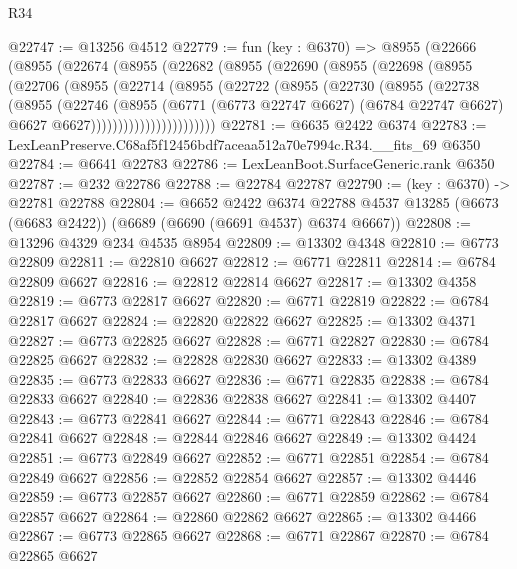 \begin{lexlean}{R34}
\begin{coremodule}
@22747 := @13256 @4512
@22779 := fun (key : @6370) =>
  @8955
    (@22666
      (@8955
        (@22674
          (@8955
            (@22682
              (@8955
                (@22690
                  (@8955
                    (@22698
                      (@8955
                        (@22706
                          (@8955
                            (@22714
                              (@8955
                                (@22722
                                  (@8955
                                    (@22730
                                      (@8955
                                        (@22738
                                          (@8955
                                            (@22746
                                              (@8955
                                                (@6771
                                                  (@6773 @22747 @6627)
                                                  (@6784 @22747 @6627)
                                                  @6627
                                                  @6627)))))))))))))))))))))))
@22781 := @6635 @2422 @6374
@22783 := LexLeanPreserve.C68af5f12456bdf7aceaa512a70e7994c.R34.__fits_69 @6350
@22784 := @6641 @22783
@22786 := LexLeanBoot.SurfaceGeneric.rank @6350
@22787 := @232 @22786
@22788 := @22784 @22787
@22790 := (key : @6370) -> @22781 @22788
@22804 := @6652
    @2422
    @6374
    @22788
    @4537
    @13285
    (@6673 (@6683 @2422))
    (@6689 (@6690 (@6691 @4537) @6374 @6667))
@22808 := @13296 @4329 @234 @4535 @8954
@22809 := @13302 @4348
@22810 := @6773 @22809
@22811 := @22810 @6627
@22812 := @6771 @22811
@22814 := @6784 @22809 @6627
@22816 := @22812 @22814 @6627
@22817 := @13302 @4358
@22819 := @6773 @22817 @6627
@22820 := @6771 @22819
@22822 := @6784 @22817 @6627
@22824 := @22820 @22822 @6627
@22825 := @13302 @4371
@22827 := @6773 @22825 @6627
@22828 := @6771 @22827
@22830 := @6784 @22825 @6627
@22832 := @22828 @22830 @6627
@22833 := @13302 @4389
@22835 := @6773 @22833 @6627
@22836 := @6771 @22835
@22838 := @6784 @22833 @6627
@22840 := @22836 @22838 @6627
@22841 := @13302 @4407
@22843 := @6773 @22841 @6627
@22844 := @6771 @22843
@22846 := @6784 @22841 @6627
@22848 := @22844 @22846 @6627
@22849 := @13302 @4424
@22851 := @6773 @22849 @6627
@22852 := @6771 @22851
@22854 := @6784 @22849 @6627
@22856 := @22852 @22854 @6627
@22857 := @13302 @4446
@22859 := @6773 @22857 @6627
@22860 := @6771 @22859
@22862 := @6784 @22857 @6627
@22864 := @22860 @22862 @6627
@22865 := @13302 @4466
@22867 := @6773 @22865 @6627
@22868 := @6771 @22867
@22870 := @6784 @22865 @6627

\end{coremodule}
\end{lexlean}
